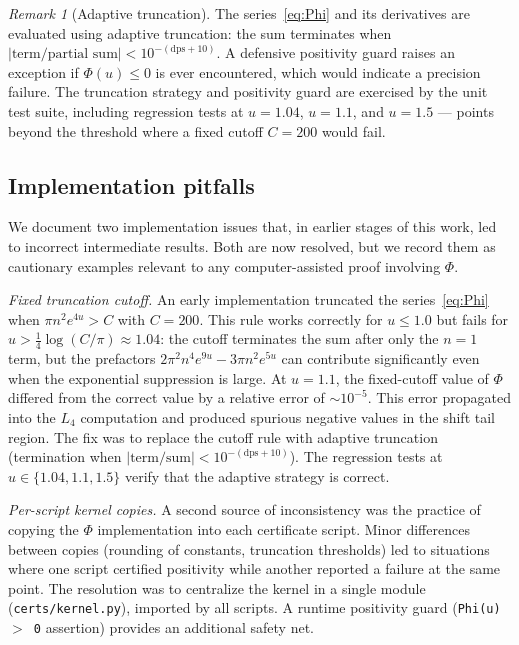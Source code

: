 \documentclass[11pt,a4paper]{amsart}
\theoremstyle{definition}
\theoremstyle{remark}
\newtheorem{remark}[theorem]{Remark}
\newcommand{\dps}{\mathrm{dps}}
\begin{document}
\begin{remark}[Adaptive truncation]\label{rem:truncation}
The series~\eqref{eq:Phi} and its derivatives are evaluated using
adaptive truncation: the sum terminates when
$|\text{term}/\text{partial sum}| < 10^{-(\dps+10)}$.
A defensive positivity guard raises an exception if
$\Phi(u) \le 0$ is ever encountered, which would indicate
a precision failure.
The truncation strategy and positivity guard are exercised by
the unit test suite, including regression tests at $u = 1.04$,
$u = 1.1$, and $u = 1.5$ --- points beyond the threshold where
a fixed cutoff $C = 200$ would fail.
\end{remark}


\subsection{Implementation pitfalls}\label{sec:pitfalls}

We document two implementation issues that, in earlier stages
of this work, led to incorrect intermediate results.
Both are now resolved, but we record them as cautionary examples
relevant to any computer-assisted proof involving $\Phi$.

\emph{Fixed truncation cutoff.}
An early implementation truncated the series~\eqref{eq:Phi}
when $\pi n^2 e^{4u} > C$ with $C = 200$.
This rule works correctly for $u \le 1.0$ but fails for
$u > \frac{1}{4}\log(C/\pi) \approx 1.04$:
the cutoff terminates the sum after only the $n=1$ term,
but the prefactors $2\pi^2 n^4 e^{9u} - 3\pi n^2 e^{5u}$ can
contribute significantly even when the exponential suppression
is large.
At $u = 1.1$, the fixed-cutoff value of $\Phi$ differed from
the correct value by a relative error of $\sim 10^{-5}$.
This error propagated into the $L_4$ computation and produced
spurious negative values in the shift tail region.
The fix was to replace the cutoff rule with adaptive truncation
(termination when $|\text{term}/\text{sum}| < 10^{-(\dps+10)}$).
The regression tests at $u \in \{1.04, 1.1, 1.5\}$ verify that
the adaptive strategy is correct.

\emph{Per-script kernel copies.}
A second source of inconsistency was the practice of copying the
$\Phi$ implementation into each certificate script.
Minor differences between copies (rounding of constants, truncation
thresholds) led to situations where one script certified positivity
while another reported a failure at the same point.
The resolution was to centralize the kernel in a single module
(\texttt{certs/kernel.py}), imported by all scripts.
A runtime positivity guard (\texttt{Phi(u)\,$>$\,0} assertion)
provides an additional safety net.
\end{document}
